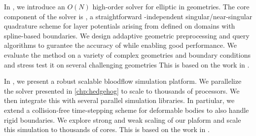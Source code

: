 In , we introduce an $O(N)$ high-order solver for elliptic \pdes in \threed geometries.
The core component of the solver is \qbkix, a straightforward \pde-independent singular/near-singular quadrature scheme for layer potentials arising from \pdes defined on domains with spline-based boundaries.
We design addaptive geometric preprocessing and query algorithms to gurantee the accuracy of \qbkix while enabling good performance. 
We evaluate the method on a variety of complex geometries and boundary conditions and stress test it on several challenging geometries
This is based on the work in \cite{morse2020robust}.

In , we present a robust scalable bloodflow simulation platform. 
We parallelize the \pde solver presented in \cref{chp:hedgehog} to scale to thousands of processors.
We then integrate this with several parallel \rbc simulation libraries. 
In partiular, we extend a collision-free time-stepping scheme for deformable bodies to also handle rigid boundaries.
We explore strong and weak scaling of our plaform and scale this simulation to thousands of cores.
This is based on the work in \cite{lu2019scalable}.

